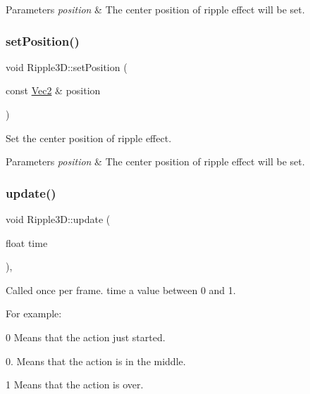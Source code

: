 \begin{DoxyParams}{Parameters}
{\em position} & The center position of ripple effect will be set. \\
\hline
\end{DoxyParams}
\mbox{\label{classRipple3D_af80c68000b6bb6f2e1d8f78cd8712ef7}} 
\subsubsection{\texorpdfstring{set\+Position()}{setPosition()}\hspace{0.1cm}{\footnotesize\ttfamily [2/2]}}
{\footnotesize\ttfamily void Ripple3\+D\+::set\+Position (\begin{DoxyParamCaption}\item[{const \hyperlink{classVec2}{Vec2} \&}]{position }\end{DoxyParamCaption})}



Set the center position of ripple effect. 


\begin{DoxyParams}{Parameters}
{\em position} & The center position of ripple effect will be set. \\
\hline
\end{DoxyParams}
\mbox{\label{classRipple3D_a99d5d92c7394aa596fbba3008096d72f}} 
\subsubsection{\texorpdfstring{update()}{update()}\hspace{0.1cm}{\footnotesize\ttfamily [1/2]}}
{\footnotesize\ttfamily void Ripple3\+D\+::update (\begin{DoxyParamCaption}\item[{float}]{time }\end{DoxyParamCaption})\hspace{0.3cm}{\ttfamily [override]}, {\ttfamily [virtual]}}

Called once per frame. time a value between 0 and 1.

For example\+:
\begin{DoxyItemize}
\item 0 Means that the action just started.
\item 0. Means that the action is in the middle.
\item 1 Means that the action is over.
\end{DoxyItemize}


